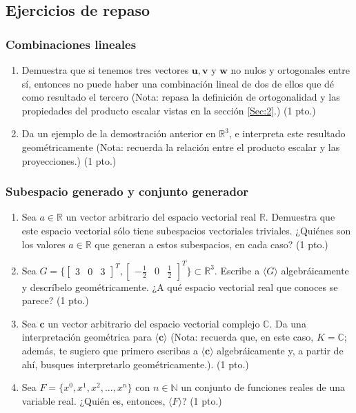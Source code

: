 \documentclass[12pt]{article}
\begin{document}
\subsection{Ejercicios de repaso}

\subsubsection{Combinaciones lineales}

\begin{enumerate}
    \item Demuestra que si tenemos tres vectores $\mathbf{u}, \mathbf{v}$ y $\mathbf{w}$ no nulos y ortogonales entre sí, entonces no puede haber una combinación lineal de dos de ellos que dé como resultado el tercero (Nota: repasa la definición de ortogonalidad y las propiedades del producto escalar vistas en la sección \ref{Sec:2}.) (1 pto.)
    \item Da un ejemplo de la demostración anterior en $\mathbb{R}^3$, e interpreta este resultado geométricamente (Nota: recuerda la relación entre el producto escalar y las proyecciones.) (1 pto.)
\end{enumerate}

\subsubsection{Subespacio generado y conjunto generador}

\begin{enumerate}
    \item Sea $a\in\mathbb{R}$ un vector arbitrario del espacio vectorial real $\mathbb{R}$. Demuestra que este espacio vectorial sólo tiene subespacios vectoriales triviales. ¿Quiénes son los valores $a\in\mathbb{R}$ que generan a estos subespacios, en cada caso? (1 pto.)
    \hypertarget{Ejer:3.4.2.2}{} \item Sea $G=\{\begin{bmatrix} 3 & 0 & 3 \end{bmatrix}^T, \begin{bmatrix} -\frac{1}{2} & 0 & \frac{1}{2} \end{bmatrix}^T\}\subset\mathbb{R}^3.$ Escribe a $\langle G \rangle$ algebráicamente y descríbelo geométricamente. ¿A qué espacio vectorial real que conoces se parece? (1 pto.)
    \item Sea $\mathbf{c}$ un vector arbitrario del espacio vectorial complejo $\mathbb{C}$. Da una interpretación geométrica para $\langle \mathbf{c} \rangle$ (Nota: recuerda que, en este caso, $K=\mathbb{C}$; además, te sugiero que primero escribas a $\langle \mathbf{c}\rangle$ algebráicamente y, a partir de ahí, busques interpretarlo geométricamente.). (1 pto.)
    \item Sea $F=\{x^0,x^1,x^2,...,x^n\}$ con $n\in\mathbb{N}$ un conjunto de funciones reales de una variable real. ¿Quién es, entonces, $\langle F \rangle$? (1 pto.)
\end{enumerate}
\end{document}
